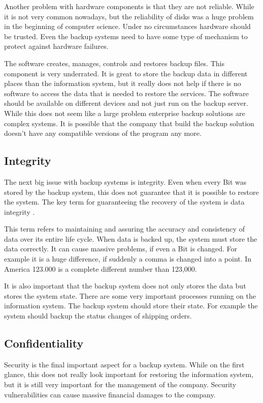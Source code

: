 Another problem with hardware components is that they are not reliable.
While it is not very common nowadays, but the reliability of disks was a
huge problem in the  beginning of computer science. Under no
circumstances hardware should be trusted. Even the backup systems need
to have some type of mechanism to protect against hardware failures.

The software creates, manages, controls and restores backup files. This
component is very underrated.  It is great to store the backup data in
different places than the information system, but it really does not
help if there is no software to access the data that is needed to
restore the services. The software should be available on different
devices and not just run on the backup server. While this does not seem
like a large problem enterprise backup solutions are complex systems. It
is possible that the company that build the backup solution doesn't have
any compatible versions of the program any more.

\subsection{Integrity}

The next big issue with backup systems is integrity.  Even when every
Bit was stored by the backup system, this does not guarantee that it is
possible to restore the system. The key term for guaranteeing the
recovery of the system is data integrity \cite{WikiD}.

This term refers to maintaining and assuring the accuracy and
consistency of data over its entire life cycle. When data is backed up,
the system must store the data correctly. It can cause massive problems,
if even a Bit is changed.  For example it is a huge difference, if
suddenly a comma is changed into a point. In America 123.000 is a
complete different number than 123,000.

It is also important that the backup system does not only stores the
data but stores the system state. There are some very important
processes running on the information system. The backup system should
store their state. For example the system should backup the status
changes of shipping orders.

\subsection{Confidentiality}

Security is the final important aspect for a backup system.  While on
the first glance, this does not really look important for restoring the
information system, but it is still very important for the management of
the company. Security vulnerabilities can cause massive financial
damages to the company.

